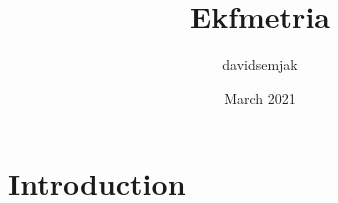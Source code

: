 \documentclass{article}
\title{Ekfmetria}
\author{davidsemjak }
\date{March 2021}
\begin{document}
\maketitle

\section{Introduction}
\end{document}
